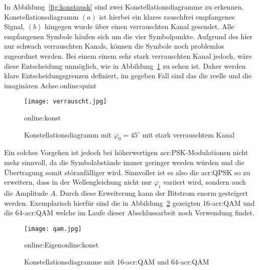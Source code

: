 In Abbildung~\ref{fig:konstqpsk} sind zwei Konstellationsdiagramme zu erkennen. Konstellationsdiagramm $(a)$ ist hierbei ein klares rauschfrei empfangenes Signal, $(b)$ hingegen wurde über einen verrauschten Kanal gesendet. Alle empfangenen Symbole häufen sich um die vier Symbolpunkte. Aufgrund des hier nur schwach verrauschten Kanals, können die Symbole noch problemlos zugeordnet werden. Bei einem einem sehr stark verrauschten Kanal jedoch, wäre diese Entscheidung unmöglich, wie in Abbildung~\ref{fig:verrauscht} zu sehen ist. Daher werden klare Entscheidungsgrenzen definiert, im gegeben Fall sind das die reelle und die imaginären Achse.\gls{online:quint}

\begin{figure}[H]
	\centering
	\texttt{[image: verrauscht.jpg]}
	\caption[Konstellationsdiagramm mit $\varphi_{0}=45^\circ$ mit stark verrauschtem Kanal]{Konstellationsdiagramm mit $\varphi_{0}=45^\circ$ mit stark verrauschtem Kanal} 
	\gls{online:konst}
	\label{fig:verrauscht}
\end{figure}

Ein solches Vorgehen ist jedoch bei höherwertigen \gls{acr:PSK}-Modulationen nicht mehr sinnvoll, da die Symbolabstände immer geringer werden würden und die Übertragung somit störanfälliger wird. Sinnvoller ist es also die \gls{acr:QPSK} so zu erweitern, dass
 in der Wellengleichung nicht nur $\varphi_{i}$ variiert wird, sondern auch die Amplitude $A$. Durch diese Erweiterung kann der Bitstrom enorm gesteigert werden. Exemplarisch hierfür sind die in Abbildung~\ref{fig:qam} gezeigten 16-\gls{acr:QAM} und die 64-\gls{acr:QAM} welche im Laufe dieser Abschlussarbeit noch Verwendung findet.

\begin{figure}[H]
	\centering
	\texttt{[image: qam.jpg]}
	\caption[Konstellationsdiagramm 16-\gls{acr:QAM} und 64-\gls{acr:QAM}]{Konstellationsdiagramme mit  16-\gls{acr:QAM} und 64-\gls{acr:QAM}} 
	\gls{online:Eigen}\gls{online:konst}
	\label{fig:qam}
\end{figure}



